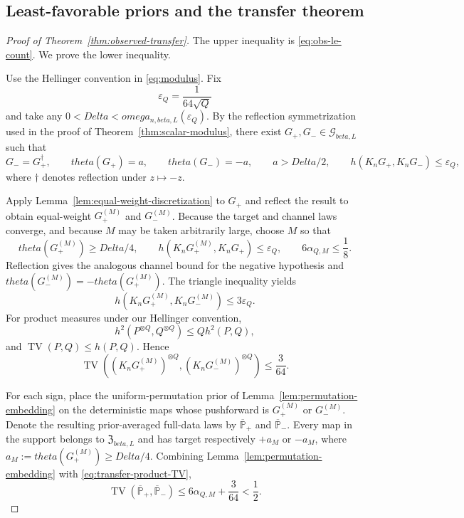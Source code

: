 \documentclass[11pt]{article}
\def\beta{beta}%
\def\theta{theta}%
\def\omega{omega}%
\def\Delta{Delta}%
\newcommand{\TV}{\operatorname{TV}}
\newcommand{\calG}{\mathcal G}
\begin{document}
\subsection{Least-favorable priors and the transfer theorem}

\begin{proof}[Proof of Theorem~\ref{thm:observed-transfer}]
The upper inequality is \eqref{eq:obs-le-count}.  We prove the lower inequality.

Use the Hellinger convention in \eqref{eq:modulus}.  Fix
\[
\varepsilon_Q=\frac{1}{64\sqrt Q}
\]
and take any $0<\Delta<\omega_{n,\beta,L}(\varepsilon_Q)$.  By the reflection symmetrization used in the proof of Theorem~\ref{thm:scalar-modulus}, there exist $G_+,G_-\in\calG_{\beta,L}$ such that
\begin{equation}
\label{eq:transfer-hard-pair}
G_-=G_+^\dagger,
\qquad
\theta(G_+)=a,
\qquad
\theta(G_-)=-a,
\qquad
a>\Delta/2,
\qquad
h(K_nG_+,K_nG_-)\le\varepsilon_Q,
\end{equation}
where $\dagger$ denotes reflection under $z\mapsto-z$.

Apply Lemma~\ref{lem:equal-weight-discretization} to $G_+$ and reflect the result to obtain equal-weight $G^{(M)}_+$ and $G^{(M)}_-$.  Because the target and channel laws converge, and because $M$ may be taken arbitrarily large, choose $M$ so that
\begin{equation}
\label{eq:transfer-M-choices}
\theta(G^{(M)}_+)\ge\Delta/4,
\qquad
h(K_nG^{(M)}_+,K_nG_+)\le\varepsilon_Q,
\qquad
6\alpha_{Q,M}\le\frac18.
\end{equation}
Reflection gives the analogous channel bound for the negative hypothesis and $\theta(G^{(M)}_-)=-\theta(G^{(M)}_+)$.  The triangle inequality yields
\[
h(K_nG^{(M)}_+,K_nG^{(M)}_-)
\le3\varepsilon_Q.
\]
For product measures under our Hellinger convention,
\[
h^2(P^{\otimes Q},Q^{\otimes Q})
\le
Qh^2(P,Q),
\]
and $\TV(P,Q)\le h(P,Q)$.  Hence
\begin{equation}
\label{eq:transfer-product-TV}
\TV\!\left(
(K_nG^{(M)}_+)^{\otimes Q},
(K_nG^{(M)}_-)^{\otimes Q}
\right)
\le
\frac{3}{64}.
\end{equation}

For each sign, place the uniform-permutation prior of Lemma~\ref{lem:permutation-embedding} on the deterministic maps whose pushforward is $G^{(M)}_+$ or $G^{(M)}_-$.  Denote the resulting prior-averaged full-data laws by $\overline{\mathbb P}_+$ and $\overline{\mathbb P}_-$.  Every map in the support belongs to $\mathfrak Z_{\beta,L}$ and has target respectively $+a_M$ or $-a_M$, where $a_M:=\theta(G^{(M)}_+)\ge\Delta/4$.  Combining Lemma~\ref{lem:permutation-embedding} with \eqref{eq:transfer-product-TV},
\[
\TV(\overline{\mathbb P}_+,\overline{\mathbb P}_-)
\le
6\alpha_{Q,M}+\frac{3}{64}
<\frac12.
\]


\end{proof}
\end{document}
